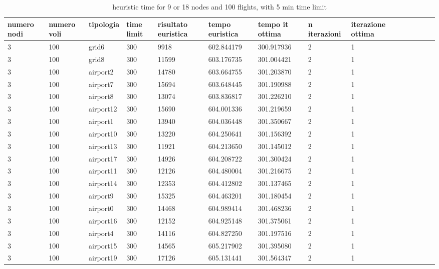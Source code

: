\documentclass[../thesis.tex]{subfiles}
\begin{document}
\begin{table}[!ht]
\caption{heuristic time for 9 or 18 nodes and 100 flights, with 5 min time limit}
    \centering
    \begin{tabularx}{\textwidth}{|X|X|X|X|X|X|X|X|X|X|X|X|X|X|}
    \hline
        numero nodi & numero voli & tipologia & time limit & risultato euristica & tempo euristica & tempo it ottima & n iterazioni &iterazione ottima  \\ \hline
        3 & 100 & grid6 & 300 & 9918 & 602.844179 & 300.917936 & 2 & 1 \\ \hline
        3 & 100 & grid8 & 300 & 11599 & 603.176735 & 301.004421 & 2 & 1 \\ \hline
        3 & 100 & airport2 & 300 & 14780 & 603.664755 & 301.203870 & 2 & 1 \\ \hline
        3 & 100 & airport7 & 300 & 15694 & 603.648445 & 301.190988 & 2 & 1 \\ \hline
        3 & 100 & airport8 & 300 & 13074 & 603.836817 & 301.226210 & 2 & 1 \\ \hline
        3 & 100 & airport12 & 300 & 15690 & 604.001336 & 301.219659 & 2 & 1 \\ \hline
        3 & 100 & airport1 & 300 & 13940 & 604.036448 & 301.350667 & 2 & 1 \\ \hline
        3 & 100 & airport10 & 300 & 13220 & 604.250641 & 301.156392 & 2 & 1 \\ \hline
        3 & 100 & airport13 & 300 & 11921 & 604.213650 & 301.145012 & 2 & 1 \\ \hline
        3 & 100 & airport17 & 300 & 14926 & 604.208722 & 301.300424 & 2 & 1 \\ \hline
        3 & 100 & airport11 & 300 & 12126 & 604.480004 & 301.216675 & 2 & 1 \\ \hline
        3 & 100 & airport14 & 300 & 12353 & 604.412802 & 301.137465 & 2 & 1 \\ \hline
        3 & 100 & airport9 & 300 & 15325 & 604.463201 & 301.180454 & 2 & 1 \\ \hline
        3 & 100 & airport0 & 300 & 14468 & 604.989414 & 301.468236 & 2 & 1 \\ \hline
        3 & 100 & airport16 & 300 & 12152 & 604.925148 & 301.375061 & 2 & 1 \\ \hline
        3 & 100 & airport4 & 300 & 14116 & 604.827250 & 301.197516 & 2 & 1 \\ \hline
        3 & 100 & airport15 & 300 & 14565 & 605.217902 & 301.395080 & 2 & 1 \\ \hline
        3 & 100 & airport19 & 300 & 17126 & 605.131441 & 301.564347 & 2 & 1 \\ \hline

\end{tabularx}
\end{table}
\end{document}
